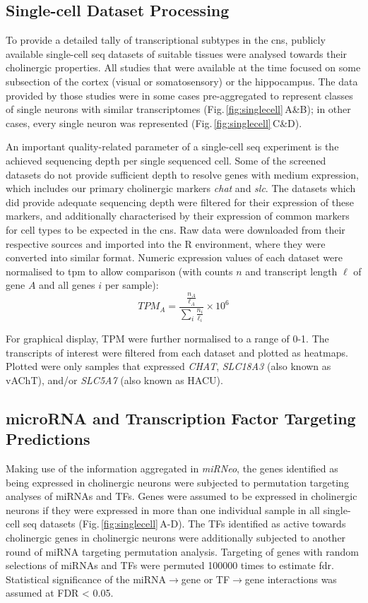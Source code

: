 \begin{method}
\subsection{Single-cell Dataset Processing}

To provide a detailed tally of transcriptional subtypes in the \ac{cns}, publicly available single-cell \ac{seq} datasets of suitable tissues were analysed towards their cholinergic properties. All studies that were available at the time focused on some subsection of the cortex (visual or somatosensory) or the hippocampus. The data provided by those studies were in some cases pre-aggregated to represent classes of single neurons with similar transcriptomes (Fig.\,\ref{fig:singlecell}\,A\&B\cite{Zeisel2015, Tasic2016}); in other cases, every single neuron was represented (Fig.\,\ref{fig:singlecell}\,C\&D\cite{Darmanis2015, Habib2016}). 

An important quality-related parameter of a single-cell \ac{seq} experiment is the achieved sequencing depth per single sequenced cell. Some of the screened datasets do not provide sufficient depth to resolve genes with medium expression, which includes our primary cholinergic markers \textit{\ac{chat}} and \textit{\ac{slc}}. The datasets which did provide adequate sequencing depth were filtered for their expression of these markers, and additionally characterised by their expression of common markers for cell types to be expected in the \ac{cns}. Raw data were downloaded from their respective sources and imported into the R environment, where they were converted into similar format. Numeric expression values of each dataset were normalised to \ac{tpm} to allow comparison (with counts $n$ and transcript length $\ell$ of gene $A$ and all genes $i$ per sample): $$TPM_A = \frac{\frac{n_A}{\ell_A}}{\sum_i \frac{n_i}{\ell_i}}\times 10^6$$

For graphical display, TPM were further normalised to a range of \num{0}-\num{1}. The transcripts of interest were filtered from each dataset and plotted as heatmaps. Plotted were only samples that expressed \emph{CHAT}, \emph{SLC18A3} (also known as vAChT), and/or \emph{SLC5A7} (also known as HACU).

\subsection{microRNA and Transcription Factor Targeting Predictions}
Making use of the information aggregated in \emph{miRNeo}, the genes identified as being expressed in cholinergic neurons were subjected to permutation targeting analyses of miRNAs and TFs. Genes were assumed to be expressed in cholinergic neurons if they were expressed in more than one individual sample in all single-cell \ac{seq} datasets (Fig.\,\ref{fig:singlecell}\,A-D). The TFs identified as active towards cholinergic genes in cholinergic neurons were additionally subjected to another round of miRNA targeting permutation analysis. Targeting of genes with random selections of miRNAs and TFs were permuted \num{100000} times to estimate \ac{fdr}. Statistical significance of the miRNA$\to$gene or TF$\to$gene interactions was assumed at FDR < 0.05.


\end{method}
